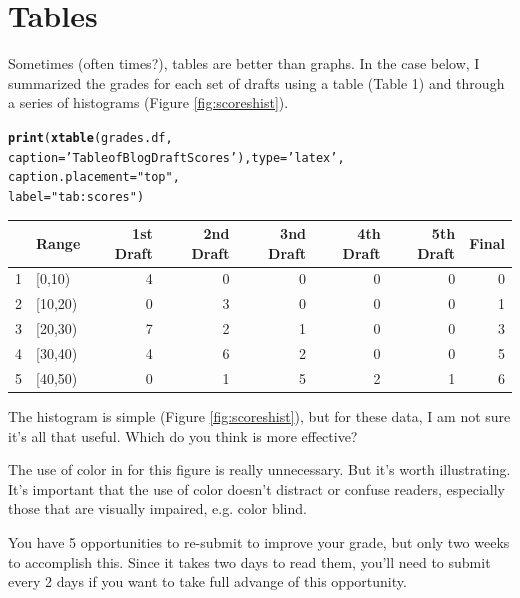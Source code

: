 \documentclass{article}\usepackage[]{graphicx}\usepackage[]{color}
\makeatletter
\newcommand{\hlstr}[1]{\textcolor[rgb]{0.192,0.494,0.8}{#1}}%
\newcommand{\hlstd}[1]{\textcolor[rgb]{0.345,0.345,0.345}{#1}}%
\newcommand{\hlkwc}[1]{\textcolor[rgb]{0.333,0.667,0.333}{#1}}%
\newcommand{\hlkwd}[1]{\textcolor[rgb]{0.737,0.353,0.396}{\textbf{#1}}}%
\newenvironment{kframe}{%
 \def\at@end@of@kframe{}%
 \ifinner\ifhmode%
  \def\at@end@of@kframe{\end{minipage}}%
  \begin{minipage}{\columnwidth}%
 \fi\fi%
 \def\FrameCommand##1{\hskip\@totalleftmargin \hskip-\fboxsep
 \colorbox{shadecolor}{##1}\hskip-\fboxsep
     \hskip-\linewidth \hskip-\@totalleftmargin \hskip\columnwidth}%
 \MakeFramed {\advance\hsize-\width
   \@totalleftmargin\z@ \linewidth\hsize
   \@setminipage}}%
 {\par\unskip\endMakeFramed%
 \at@end@of@kframe}
\makeatother
\begin{document}
\section{Tables}

Sometimes (often times?), tables are better than graphs. In the case below, I summarized the grades for each set of drafts using a table (Table 1) and through a series of histograms (Figure \ref{fig:scoreshist}). 




\begin{kframe}
\begin{alltt}
\hlkwd{print}\hlstd{(}\hlkwd{xtable}\hlstd{(grades.df,}
      \hlkwc{caption}\hlstd{=}\hlstr{'Table of Blog Draft Scores'}\hlstd{),} \hlkwc{type}\hlstd{=}\hlstr{'latex'}\hlstd{,}
      \hlkwc{caption.placement} \hlstd{=} \hlstr{"top"}\hlstd{,}
      \hlkwc{label}\hlstd{=}\hlstr{"tab:scores"}\hlstd{)}
\end{alltt}
\end{kframe}%
% 
\begin{tabular}{rlrrrrrr}
  \hline
 & Range & 1st Draft & 2nd Draft & 3nd Draft & 4th Draft & 5th Draft & Final \\ 
  \hline
1 & [0,10) &   4 &   0 &   0 &   0 &   0 &   0 \\ 
  2 & [10,20) &   0 &   3 &   0 &   0 &   0 &   1 \\ 
  3 & [20,30) &   7 &   2 &   1 &   0 &   0 &   3 \\ 
  4 & [30,40) &   4 &   6 &   2 &   0 &   0 &   5 \\ 
  5 & [40,50) &   0 &   1 &   5 &   2 &   1 &   6 \\ 
   \hline
\end{tabular}


\bigskip

The histogram is simple (Figure \ref{fig:scoreshist}), but for these data, I am not sure it's all that useful. Which do you think is more effective? 

The use of color in for this figure is really unnecessary. But it's worth illustrating. It's important that the use of color doesn't distract or confuse readers, especially those that are visually impaired, e.g. color blind.

\bigskip

You have 5 opportunities to re-submit to improve your grade, but only two weeks to accomplish this. Since it takes two days to read them, you'll need to submit every 2 days if you want to take full advange of this opportunity. 
\end{document}
